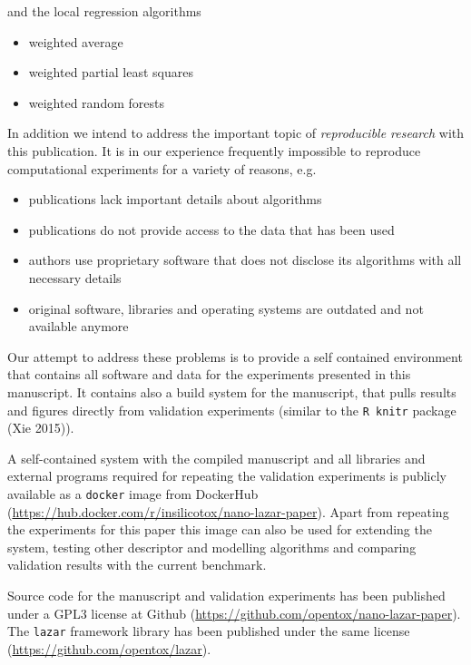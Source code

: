 \documentclass[utf8]{frontiersHLTH} %
\providecommand{\tightlist}{%
  \setlength{\itemsep}{0pt}\setlength{\parskip}{0pt}}
\begin{document}
and the local regression algorithms

\begin{itemize}
\tightlist
\item
  weighted average
\item
  weighted partial least squares
\item
  weighted random forests
\end{itemize}

In addition we intend to address the important topic of
\emph{reproducible research} with this publication. It is in our
experience frequently impossible to reproduce computational experiments
for a variety of reasons, e.g.

\begin{itemize}
\tightlist
\item
  publications lack important details about algorithms
\item
  publications do not provide access to the data that has been used
\item
  authors use proprietary software that does not disclose its algorithms
  with all necessary details
\item
  original software, libraries and operating systems are outdated and
  not available anymore
\end{itemize}

Our attempt to address these problems is to provide a self contained
environment that contains all software and data for the experiments
presented in this manuscript. It contains also a build system for the
manuscript, that pulls results and figures directly from validation
experiments (similar to the \texttt{R\ knitr} package (Xie 2015)).

A self-contained system with the compiled manuscript and all libraries
and external programs required for repeating the validation experiments
is publicly available as a \texttt{docker} image from DockerHub
(\url{https://hub.docker.com/r/insilicotox/nano-lazar-paper}). Apart
from repeating the experiments for this paper this image can also be
used for extending the system, testing other descriptor and modelling
algorithms and comparing validation results with the current benchmark.

Source code for the manuscript and validation experiments has been
published under a GPL3 license at Github
(\url{https://github.com/opentox/nano-lazar-paper}). The \texttt{lazar}
framework library has been published under the same license
(\url{https://github.com/opentox/lazar}).
\end{document}
